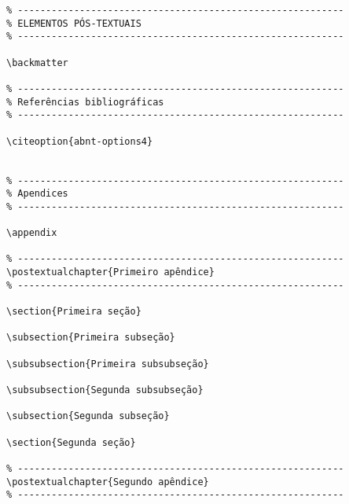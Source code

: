 \documentclass[a4paper,12pt,oneside,onecolumn]{article}
\begin{document}
\begin{verbatim}
% ----------------------------------------------------------
% ELEMENTOS PÓS-TEXTUAIS
% ----------------------------------------------------------

\backmatter

% ----------------------------------------------------------
% Referências bibliográficas
% ----------------------------------------------------------

\citeoption{abnt-options4}


% ----------------------------------------------------------
% Apendices
% ----------------------------------------------------------

\appendix

% ----------------------------------------------------------
\postextualchapter{Primeiro apêndice}
% ----------------------------------------------------------

\section{Primeira seção}

\subsection{Primeira subseção}

\subsubsection{Primeira subsubseção}

\subsubsection{Segunda subsubseção}

\subsection{Segunda subseção}

\section{Segunda seção}

% ----------------------------------------------------------
\postextualchapter{Segundo apêndice}
% ----------------------------------------------------------


\end{verbatim}
\end{document}
